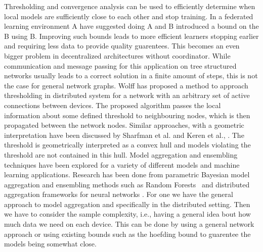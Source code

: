 Thresholding and convergence analysis can be used to efficiently determine when local models are sufficiently close to each other and stop training.
In a federated learning environment A have suggested doing A and B introduced a bound on the B using B.
Improving such bounds leads to more efficient learners stopping earlier and requiring less data to provide quality guarentees.
This becomes an even bigger problem in decentralized architectures without coordinator.
While communication and message passing for this application on tree structured networks usually leads to a correct solution in a finite amount of steps, this is not the case for general network graphs.
Wolff \cite{wolff2013local} has proposed a method to approach thresholding in distributed system for a network with an arbitrary set of active connections between devices.
The proposed algorithm passes the local information about some defined threshold to neighbouring nodes, which is then propagated between the network nodes. 
Similar approaches, with a geometric interpretation have been discussed by Sharfman et al. \cite{sharfman2007geometric} and Keren et al., \cite{keren2011shape}. 
The threshold is geometrically interpreted as a convex hull and models violating the threshold are not contained in this hull. 
Model aggregation and ensembling techniques have been explored for a variety of different models and machine learning applications.
Research has been done from parametric Bayesian model aggregation \cite{hoeting1999bayesian}\cite{de2011bayesian} and ensembling methods such as Random Forests~\cite{breiman2001random} and distributed aggregation frameworks for neural networks \cite{mcmahan2016communication}.
For one we have the general approach to model aggregation and specifically in the distributed setting.
Then we have to consider the sample complexity, i.e., having a general idea bout how much data we need on each device.
This can be done by using a general network approach or using existing bounds such as the hoefding bound to guarentee the models being somewhat close.

